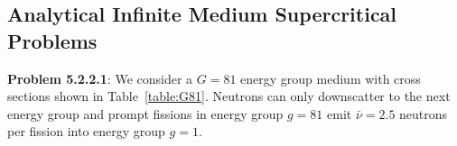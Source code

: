 
\subsection{Analytical Infinite Medium Supercritical Problems}


\textbf{Problem 5.2.2.1}: We consider a $G = 81$ energy group medium with cross sections shown in Table~\ref{table:G81}. Neutrons can only downscatter to the next energy group and prompt fissions in energy group $g = 81$ emit $\bar{\nu} = 2.5$ neutrons per fission into energy group $g = 1$.

